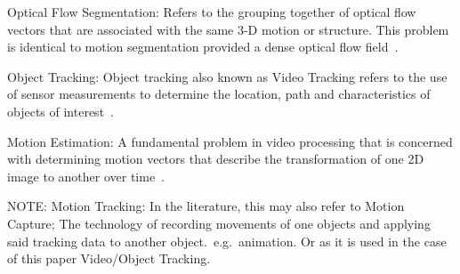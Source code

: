 Optical Flow Segmentation: Refers to the grouping together of optical flow
vectors that are associated with the same 3-D motion or structure. This problem
is identical to motion segmentation provided a dense optical flow field~\cite{Tekalp2014}.

Object Tracking: Object tracking also known as Video Tracking refers to the use
of sensor measurements to determine the location, path and characteristics of
objects of interest~\cite{Challa2011}.
 
Motion Estimation: A fundamental problem in video processing that is concerned
with determining motion vectors that describe the transformation of one 2D
image to another over time~\cite{Tekalp2014}.

NOTE:\@
Motion Tracking: In the literature, this may also refer to Motion Capture;
The technology of recording movements of one objects and applying said
tracking data to another object.\ e.g.\ animation. Or as it is used in the
case of this paper Video/Object Tracking.


